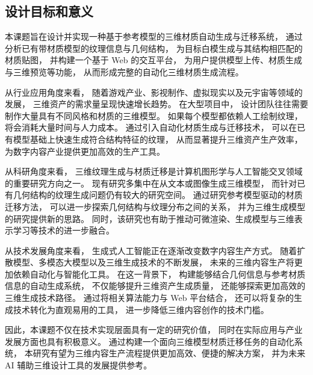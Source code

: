 \subsection{设计目标和意义}

本课题旨在设计并实现一种基于参考模型的三维材质自动生成与迁移系统，
通过分析已有带材质模型的纹理信息与几何结构，
为目标白模生成与其结构相匹配的材质贴图，
并构建一个基于 Web 的交互平台，
为用户提供模型上传、材质生成与三维预览等功能，
从而形成完整的自动化三维材质生成流程。

从行业应用角度来看，
随着游戏产业、影视制作、虚拟现实以及元宇宙等领域的发展，
三维资产的需求量呈现快速增长趋势。
在大型项目中，
设计团队往往需要制作大量具有不同风格和材质的三维模型。
如果每个模型都依赖人工绘制纹理，
将会消耗大量时间与人力成本。
通过引入自动化材质生成与迁移技术，
可以在已有模型基础上快速生成符合结构特征的纹理，
从而显著提升三维资产生产效率，
为数字内容产业提供更加高效的生产工具。

从科研角度来看，
三维纹理生成与材质迁移是计算机图形学与人工智能交叉领域的重要研究方向之一。\cite{chen2024advances3dneuralstylization}
现有研究多集中在从文本或图像生成三维模型，
而针对已有几何结构的纹理生成问题仍有较大的研究空间。
通过研究参考模型驱动的材质迁移方法，
可以进一步探索几何结构与纹理分布之间的关系，
并为三维生成模型的研究提供新的思路。
同时，该研究也有助于推动可微渲染、生成模型与三维表示学习等技术的进一步融合。

从技术发展角度来看，
生成式人工智能正在逐渐改变数字内容生产方式。
随着扩散模型、多模态大模型以及三维生成技术的不断发展，
未来的三维内容生产将更加依赖自动化与智能化工具。
在这一背景下，
构建能够结合几何信息与参考材质信息的自动生成系统，
不仅能够提升三维资产生成质量，
还能够探索更加高效的三维生成技术路径。
通过将相关算法能力与 Web 平台结合，
还可以将复杂的生成技术转化为直观易用的工具，
进一步降低三维内容创作的技术门槛。

因此，本课题不仅在技术实现层面具有一定的研究价值，
同时在实际应用与产业发展方面也具有积极意义。
通过构建一个面向三维模型材质迁移任务的自动化系统，
本研究有望为三维内容生产流程提供更加高效、便捷的解决方案，
并为未来 AI 辅助三维设计工具的发展提供参考。